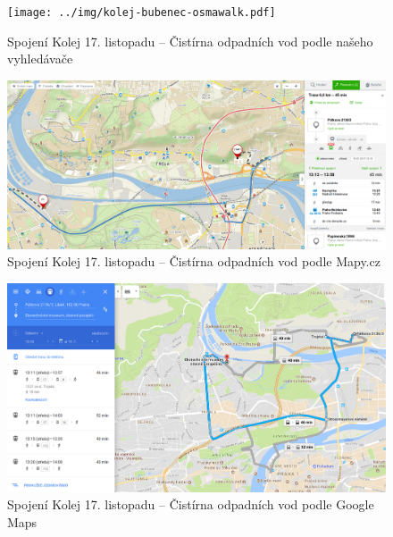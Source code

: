 \begin{figure}[h]
  \centering
    \texttt{[image: ../img/kolej-bubenec-osmawalk.pdf]}
  \caption{Spojení Kolej 17. listopadu -- Čistírna odpadních vod podle našeho
  vyhledávače}
  \label{fig:kolej-bubenec-osmawalk}
\end{figure}
\begin{figure}[h]
  \centering
    \includegraphics[width=\textwidth]{../img/kolej-bubenec-seznam.png}
  \caption{Spojení Kolej 17. listopadu -- Čistírna odpadních vod podle Mapy.cz}
  \label{fig:kolej-bubenec-seznam}
\end{figure}
\begin{figure}[h]
  \centering
    \includegraphics[width=\textwidth]{../img/kolej-bubenec-google.png}
  \caption{Spojení Kolej 17. listopadu -- Čistírna odpadních vod podle Google
  Maps}
  \label{fig:kolej-bubenec-google}
\end{figure}

\clearpage
